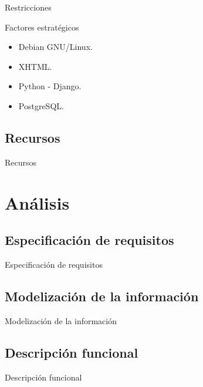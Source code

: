 \documentclass[10pt, hyperref={pdfpagelabels=false}]{beamer}
\begin{document}
      \begin{frame}{Restricciones}
        \begin{block}{Factores estratégicos}
          \begin{itemize}
           \item Debian GNU/Linux.
           \item XHTML.
           \item Python - Django.
           \item PostgreSQL.
          \end{itemize}
        \end{block}
      \end{frame}


    \subsection{Recursos}
      \begin{frame}{Recursos}

      \end{frame}


  \section{Análisis}
    \subsection{Especificación de requisitos}
      \begin{frame}{Especificación de requisitos}

      \end{frame}

    \subsection{Modelización de la información}
      \begin{frame}{Modelización de la información}

      \end{frame}

    \subsection{Descripción funcional}
      \begin{frame}{Descripción funcional}

      \end{frame}
\end{document}
